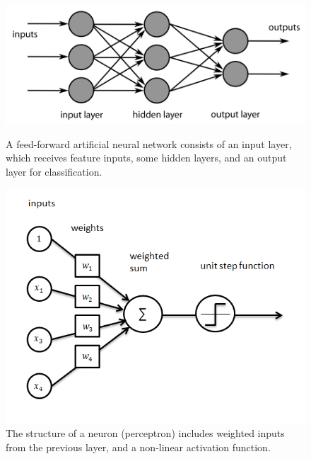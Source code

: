 \documentclass[a4paper]{article}
\begin{document}
\begin{figure}[h]
\begin{minipage}{0.45\textwidth}
\centering
\includegraphics[scale=0.25]{feed_forward_neural_net}
\caption{A feed-forward artificial neural network consists of an input layer, which receives feature inputs, some hidden layers, and an output layer for classification.}
\end{minipage}
\hspace{1cm}
\begin{minipage}{0.45\textwidth}
\centering
\includegraphics[scale=0.55]{perceptron}
\caption{The structure of a neuron (perceptron) includes weighted inputs from the previous layer, and a non-linear activation function.}
\end{minipage}
\end{figure}
\end{document}

